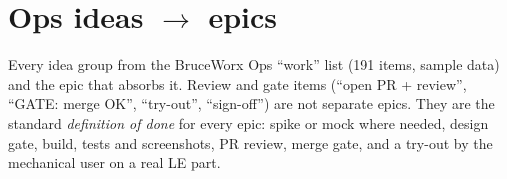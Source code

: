 \section{Ops ideas $\rightarrow$ epics}\label{app:ideas}

Every idea group from the BruceWorx Ops ``work'' list (191 items, sample data) and the epic that absorbs it.
Review and gate items (``open PR + review'', ``GATE: merge OK'', ``try-out'', ``sign-off'') are not separate
epics. They are the standard \emph{definition of done} for every epic: spike or mock where needed, design gate,
build, tests and screenshots, PR review, merge gate, and a try-out by the mechanical user on a real LE part.

